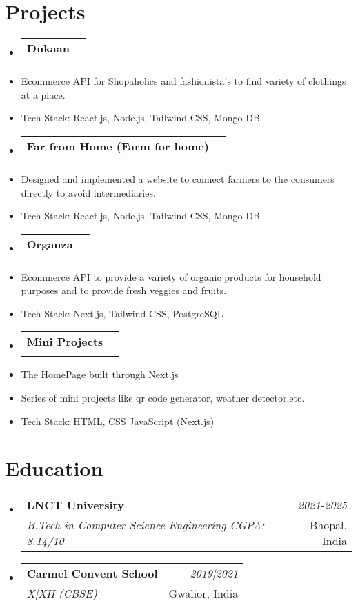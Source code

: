 \documentclass[a4paper,11pt]{article}
\makeatletter
\newcommand{\resumeItem}[1]{\item\small{#1}}
\newcommand{\resumeSubheading}[4]{
\vspace{1mm}\item
    \begin{tabular*}{0.98\textwidth}[t]{l@{\extracolsep{\fill}}r}
        \textbf{#1} & \textit{\footnotesize{#4}} \\
        \textit{\footnotesize{#3}} & \footnotesize{#2}
    \end{tabular*}
    \vspace{-2mm}
}
\makeatother
\begin{document}
\section{\textbf{Projects}}
\begin{itemize}[leftmargin=*, labelsep=1mm]
    \resumeSubheading
        {Dukaan}{}
        {}{}
        \resumeItem{Ecommerce API for Shopaholics and fashionista's to find variety of clothings at a place.}
        \resumeItem{Tech Stack: React.js, Node.js, Tailwind CSS, Mongo DB}
        

    \resumeSubheading
        {Far from Home (Farm for home)}{}
        {}{}
        \resumeItem{Designed and implemented a website to connect farmers to the consumers directly to avoid intermediaries.}
        \resumeItem{Tech Stack: React.js, Node.js, Tailwind CSS, Mongo DB}

    \resumeSubheading
        {Organza}{}
        {}{}
        \resumeItem{Ecommerce API to provide a variety of organic products for household purposes and to provide fresh veggies and fruits.}
        \resumeItem{Tech Stack: Next,js, Tailwind CSS, PostgreSQL}

     \resumeSubheading
        {Mini Projects}{}
        {}{}
        \resumeItem{The HomePage built through Next.js}
        \resumeItem{Series of mini projects like qr code generator, weather detector,etc.}
        \resumeItem{Tech Stack: HTML, CSS JavaScript (Next.js)}
\end{itemize}

\section{\textbf{Education}}
\begin{itemize}[leftmargin=*, labelsep=1mm]
    \resumeSubheading
        {LNCT University}{Bhopal, India}
        {B.Tech in Computer Science Engineering 
        CGPA: 8.14/10}{2021-2025}
    \resumeSubheading
        {Carmel Convent School}{Gwalior, India}
        {X|XII (CBSE)}{2019|2021}
       
\end{itemize}
\end{document}
